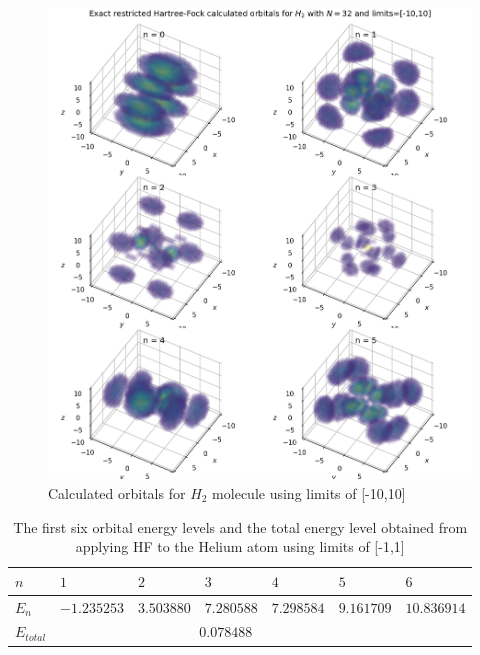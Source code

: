 \documentclass[10pt, oneside, letterpaper]{article}
\begin{document}
\begin{figure}[H]
  \begin{center}
    \includegraphics[scale=0.75]{h2_N32_l10.png}
  \end{center}
  \caption{Calculated orbitals for $H_2$ molecule using limits of [-10,10]}
  \label{h2-plot-l10}
\end{figure}

\begin{table}[H]
\begin{center}
\begin{tabular}{l|llllll}\hline
$n$    & $1$    & $2$     & $3$     & $4$      & $5$      & $6$      \\\hline
$E_n$  & $-1.235253$  & $3.503880$  & $7.280588$  & $7.298584$  & $9.161709$  & $10.836914$ \\\hline
$E_{total}$ & \multicolumn{5}{c}{$0.078488$} \\\hline
\end{tabular}
\end{center}
  \caption{The first six orbital energy levels and the total energy level obtained from applying HF to the Helium atom using limits of [-1,1]}
  \label{orbital-energies-he-l1}
\end{table}
\end{document}
